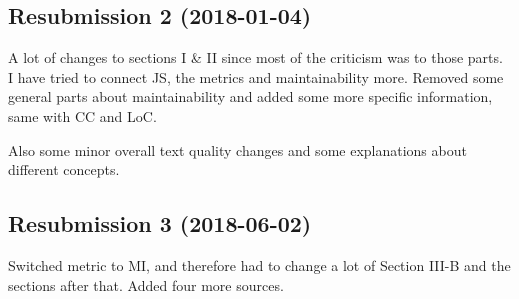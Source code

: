 \documentclass[conference, a4paper]{IEEEtran}
\begin{document}
\subsection{Resubmission 2 (2018-01-04)}

A lot of changes to sections I \& II since most of the criticism was to those parts. I have tried to connect JS, the metrics and maintainability more. Removed some general parts about maintainability and added some more specific information, same with CC and LoC.

Also some minor overall text quality changes and some explanations about different concepts.

\subsection{Resubmission 3 (2018-06-02)}
Switched metric to MI, and therefore had to change a lot of Section III-B and the sections after that. Added four more sources.
\end{document}
